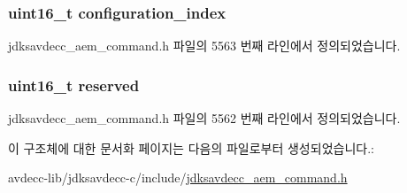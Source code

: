 \subsubsection[{\texorpdfstring{configuration\+\_\+index}{configuration_index}}]{\setlength{\rightskip}{0pt plus 5cm}uint16\+\_\+t configuration\+\_\+index}\hypertarget{structjdksavdecc__aem__command__set__configuration_afaad1bd7c66f9611e134d8c5ce98f444}{}\label{structjdksavdecc__aem__command__set__configuration_afaad1bd7c66f9611e134d8c5ce98f444}


jdksavdecc\+\_\+aem\+\_\+command.\+h 파일의 5563 번째 라인에서 정의되었습니다.

\subsubsection[{\texorpdfstring{reserved}{reserved}}]{\setlength{\rightskip}{0pt plus 5cm}uint16\+\_\+t reserved}\hypertarget{structjdksavdecc__aem__command__set__configuration_a5a6ed8c04a3db86066924b1a1bf4dad3}{}\label{structjdksavdecc__aem__command__set__configuration_a5a6ed8c04a3db86066924b1a1bf4dad3}


jdksavdecc\+\_\+aem\+\_\+command.\+h 파일의 5562 번째 라인에서 정의되었습니다.



이 구조체에 대한 문서화 페이지는 다음의 파일로부터 생성되었습니다.\+:\begin{DoxyCompactItemize}
\item 
avdecc-\/lib/jdksavdecc-\/c/include/\hyperlink{jdksavdecc__aem__command_8h}{jdksavdecc\+\_\+aem\+\_\+command.\+h}\end{DoxyCompactItemize}
